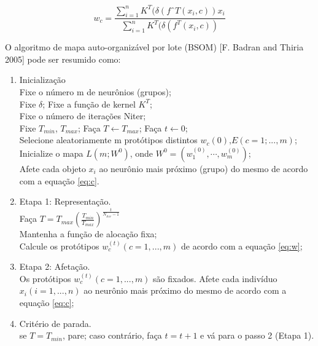 \documentclass[a4paper,oneside,12pt]{article}
\begin{document}
\begin{enumerate}[1.]
\begin{equation} \label{eq:w}
w_{c} = \frac{ \sum_{i=1}^{n} K^{T} (\delta(fˆ{T}(x_{i},c))x_{i} }{ \sum_{i=1}^{n} K^{T} (\delta(f^{T}(x_{i},c)) }
\end{equation}

O algoritmo de mapa auto-organiz\'avel por lote (BSOM) [F. Badran and Thiria 2005] pode ser resumido como:
\begin{enumerate}[1)]
\item Inicializa\c{c}\~ao \\
Fixe o n\'umero m de neur\^onios (grupos); \\
Fixe $\delta$; Fixe a fun\c{c}\~ao de kernel $K^T$; \\
Fixe o n\'umero de itera\c{c}\~oes Niter; \\
Fixe $T_{min}$, $T_{max}$; Fa\c{c}a $T \gets T_{max}$; Fa\c{c}a $t \gets 0$; \\
Selecione aleatoriamente m prot\'otipos distintos $w_{c}(0) \text{,} E (c = 1;...,m)$; \\
Inicialize o mapa $L(m;W^{0})$, onde $W^{0} = (w_{1}^{(0)}, \cdots, w_{m}^{(0)} )$; \\
Afete cada objeto $x_{i}$ ao neur\^onio mais pr\'oximo (grupo) do mesmo de acordo com
a equação \ref{eq:c}. \\

\item Etapa 1: Representa\c{c}\~ao. \\
Fa\c{c}a $T = T_{max} (\frac{T_{min}}{T_{max}})^{ \frac{t}{N_{iter} - 1} }$ \\
Mantenha a fun\c{c}\~ao de aloca\c{c}\~ao fixa; \\
Calcule os prot\'otipos $w_{c}^{(t)} (c = 1, ..., m)$ de acordo com a equa\c{c}\~ao \ref{eq:w}; \\

\item Etapa 2: Afeta\c{c}\~ao. \\
Os prot\'otipos $w_{c}^{(t)} (c = 1, ..., m)$ s\~ao fixados. Afete cada indiv\'iduo $x_{i} (i = 1, ..., n)$ ao neur\^onio mais pr\'oximo do mesmo de acordo com a equa\c{c}\~ao \ref{eq:c}; \\

\item Crit\'erio de parada. \\
se $T = T_{min}$, pare; caso contr\'ario, fa\c{c}a $t = t + 1$ e v\'a para o passo 2 (Etapa 1).\\
\end{enumerate}

\end{enumerate}
\end{document}
